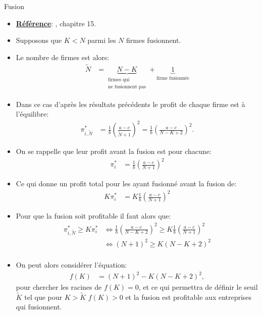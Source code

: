 \begin{frame}[allowframebreaks]{Fusion}
    \begin{itemize}
    \item \textbf{\underline{Référence}}: \cite{belleflamme_peitz_2015}, chapitre 15.
    \item Supposons que $K<N$  parmi les $N$ firmes fusionnent.
    \item Le nombre de firmes est alors:
    \begin{align*}
        \tilde{N} &= \underbrace{N-K}_{\substack{\text{firmes qui}\\\text{ne fusionnent pas}}} + \underbrace{1}_{\text{firme fusionnée}}
    \end{align*}
    \item Dans ce cas d'après les résultats précédents le profit de chaque firme est à l'équilibre:
    \begin{align*}
        \pi_{i, \tilde{N}}^* &= \frac{1}{b}\left(\frac{a-c}{\tilde{N}+1}\right)^2
        = \frac{1}{b}\left(\frac{a-c}{N-K+2}\right)^2.
    \end{align*}
    \item On se rappelle que leur profit avant la fusion est pour chacune:
    \begin{align*}
        \pi_i^* &= \frac{1}{b}\left(\frac{a-c}{N+1}\right)^2
    \end{align*}
    \item Ce qui donne un profit total pour les ayant fusionné avant la fusion de:
    \begin{align*}
        K\pi_i^* &= K\frac{1}{b}\left(\frac{a-c}{N+1}\right)^2
    \end{align*}
    \item Pour que la fusion soit profitable il faut alors que:
    \begin{align*}
        \pi_{i, \tilde{N}}^* \geq K\pi_i^*& \Leftrightarrow
         \frac{1}{b}\left(\frac{a-c}{N-K+2}\right)^2  \geq K\frac{1}{b}\left(\frac{a-c}{N+1}\right)^2\\
         & \Leftrightarrow (N+1)^2 \geq K(N-K+2)^2\\
    \end{align*}
    \item On peut alors considérer l'équation:
    \begin{align*}
        f(K) &= (N+1)^2 - K(N-K+2)^2,
    \end{align*}
    pour chercher les racines  de $f(K) = 0$, et ce qui permettra de définir le seuil $\tilde{K}$ 
    tel que pour $K > \tilde{K}$ $f(K) > 0$ et la fusion est profitable aux entreprises qui fusionnent.

\end{itemize}
\end{frame}

